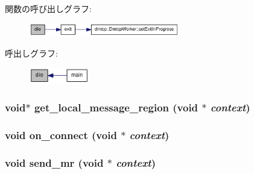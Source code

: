 関数の呼び出しグラフ:\nopagebreak
\begin{figure}[H]
\begin{center}
\leavevmode
\includegraphics[width=187pt]{rdma-common_8c_aac69fbddfabaad6d61082ad9e6f94505_cgraph}
\end{center}
\end{figure}


呼出しグラフ:\nopagebreak
\begin{figure}[H]
\begin{center}
\leavevmode
\includegraphics[width=75pt]{rdma-common_8c_aac69fbddfabaad6d61082ad9e6f94505_icgraph}
\end{center}
\end{figure}
\hypertarget{rdma-common_8c_a0162804c064e82d210197b0163278f39}{
\subsubsection[{get\_\-local\_\-message\_\-region}]{\setlength{\rightskip}{0pt plus 5cm}void$\ast$ get\_\-local\_\-message\_\-region (void $\ast$ {\em context})}}
\label{rdma-common_8c_a0162804c064e82d210197b0163278f39}
\hypertarget{rdma-common_8c_a302021034f42b123904f59dad3990962}{
\subsubsection[{on\_\-connect}]{\setlength{\rightskip}{0pt plus 5cm}void on\_\-connect (void $\ast$ {\em context})}}
\label{rdma-common_8c_a302021034f42b123904f59dad3990962}
\hypertarget{rdma-common_8c_aa7bbf375e749e0c78b50ff21ad9013f7}{
\subsubsection[{send\_\-mr}]{\setlength{\rightskip}{0pt plus 5cm}void send\_\-mr (void $\ast$ {\em context})}}
\label{rdma-common_8c_aa7bbf375e749e0c78b50ff21ad9013f7}


